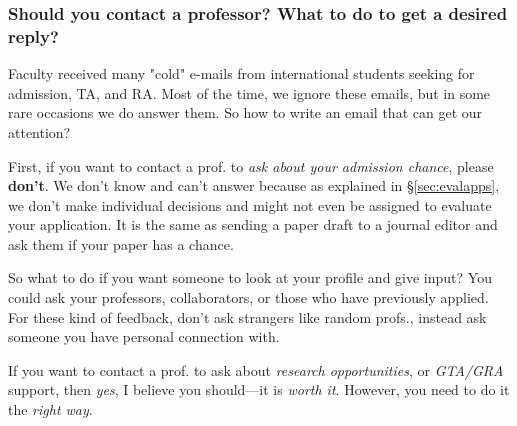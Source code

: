 \documentclass[11pt]{article}
\begin{document}


\subsubsection{Should you contact a professor? What to do to get a desired reply?}\label{sec:contact}

Faculty received many "cold" e-mails from international students seeking for admission, TA, and RA. Most of the time, we ignore these emails, but in some rare occasions we do answer them. So how to write an email that can get our attention?



First, if you want to contact a prof. to \emph{ask about your admission chance}, please \textbf{don't}. We don't know and can't answer because as explained in \S\ref{sec:evalapps}, we don't make individual decisions and might not even be assigned to evaluate your application.  It is the same as sending a paper draft to a journal editor and ask them if your paper has a chance.  

So what to do if you want someone to look at your profile and give input? You could ask your professors, collaborators, or those who have previously applied. For these kind of feedback,  don't ask strangers like random profs., instead ask someone you have personal connection with.  

If you want to contact a prof. to ask about \emph{research opportunities}, or \emph{GTA/GRA} support, then \emph{yes}, I believe you should---it is \emph{worth it}. However, you need to do it the \emph{right way}.
\end{document}
